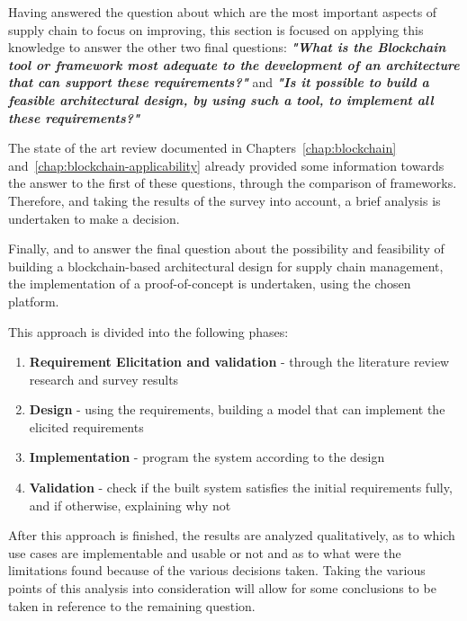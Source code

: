 Having answered the question about which are the most important aspects of supply chain to focus on improving, this section is focused on applying this knowledge to answer the other two final questions: \textbf{\textit{"What is the Blockchain tool or framework most adequate to the development of an architecture that can support these requirements?"}} and 
\textbf{\textit{"Is it possible to build a feasible architectural design, by using such a tool, to implement all these requirements?"}}


The state of the art review documented in Chapters~\ref{chap:blockchain} and~\ref{chap:blockchain-applicability} already provided some information towards the answer to the first of these questions, through the comparison of frameworks. Therefore, and taking the results of the survey into account, a brief analysis is undertaken to make a decision.

Finally, and to answer the final question about the possibility and feasibility of building a blockchain-based architectural design for supply chain management, the implementation of a proof-of-concept is undertaken, using the chosen platform. 

This approach is divided into the following phases:
\begin{enumerate}
\item \textbf{Requirement Elicitation and validation} - through the literature review research and survey results 
\item \textbf{Design} - using the requirements, building a model that can implement the elicited requirements
\item \textbf{Implementation} - program the system according to the design
\item \textbf{Validation} - check if the built system satisfies the initial requirements fully, and if otherwise, explaining why not
\end{enumerate}

After this approach is finished, the results are analyzed qualitatively, as to which use cases are implementable and usable or not and as to what were the limitations found because of the various decisions taken. Taking the various points of this analysis into consideration will allow for some conclusions to be taken in reference to the remaining question.

